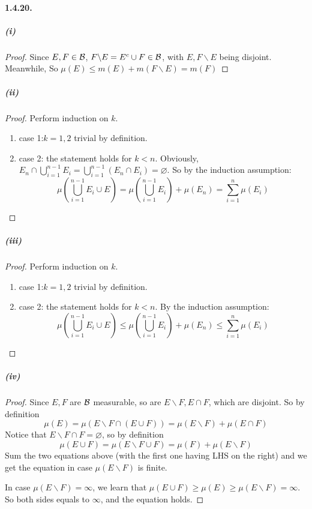 \documentclass{article}
\begin{document}
\paragraph{1.4.20.}
\subparagraph{(i)}
\begin{proof}
Since $E,F\in\mathcal{B}$, $F\backslash E=E^c\cup F\in \mathcal{B}$, with $E,F\backslash E$ being disjoint. Meanwhile, So $\mu(E)\le m(E)+m(F\backslash E)=m(F)$ 
\end{proof}
\subparagraph{(ii)}
\begin{proof}
Perform induction on $k$.
\begin{enumerate}
\item {case 1:$k=1,2$} trivial by definition.
\item {case 2: the statement holds for $k<n$}. Obviously, $E_n\cap \bigcup\limits_{i=1}^{n-1}E_i=\bigcup\limits_{i=1}^{n-1}(E_n\cap E_i)=\varnothing$. So by the induction assumption:
\[\mu(\bigcup\limits_{i=1}^{n-1}E_i\cup E)=\mu(\bigcup\limits_{i=1}^{n-1}E_i)+\mu(E_n)=\sum_{i=1}^{n}\mu(E_i)\]
\end{enumerate}
\end{proof}
\subparagraph{(iii)}
\begin{proof}
Perform induction on $k$.
\begin{enumerate}
\item {case 1:$k=1,2$} trivial by definition.
\item {case 2: the statement holds for $k<n$}.
By the induction assumption:
\[\mu(\bigcup\limits_{i=1}^{n-1}E_i\cup E)\leq\mu(\bigcup\limits_{i=1}^{n-1}E_i)+\mu(E_n)\leq\sum_{i=1}^{n}\mu(E_i)\]
\end{enumerate}
\end{proof}
\subparagraph{(iv)}
\begin{proof}
Since $E,F$ are $\mathcal{B}$ measurable, so are $E\backslash F, E\cap F$, which are disjoint. So by definition \[\mu(E)=\mu(E\backslash F\cap (E\cup F))=\mu(E\backslash F)+\mu(E\cap F)\] Notice that $E\backslash F\cap F=\varnothing$, so by definition \[\mu(E\cup F)= \mu(E\backslash F\cup F)=\mu(F)+\mu (E\backslash F)\] Sum the two equations above (with the first one having LHS on the right) and we get the equation in case $\mu(E\backslash F)$ is finite.

In case $\mu (E\backslash F)=\infty$, we learn that $\mu(E\cup F)\geq \mu(E)\geq \mu(E\backslash F)=\infty$. So both sides equals to $\infty$, and the equation holds.
\end{proof}
\end{document}
